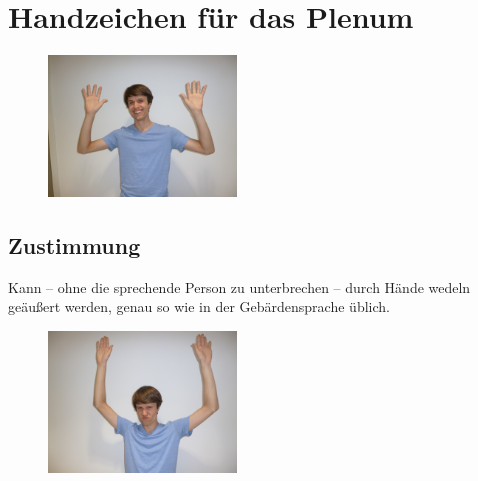 
\newpage
\section[Handzeichen]{Handzeichen für das Plenum}

\def\breite{5cm}
\def\ueberhang{0pt}
\begin{figure}
\includegraphics[width=\breite]{media/zustimmung}
\end{figure}

\subsection*{Zustimmung}
Kann -- ohne die sprechende Person zu unterbrechen -- durch Hände wedeln geäußert werden, genau so wie in der Gebärdensprache üblich. \\
\vspace{1cm}

\begin{figure}
\includegraphics[width=\breite]{media/goantrag}
\end{figure}

